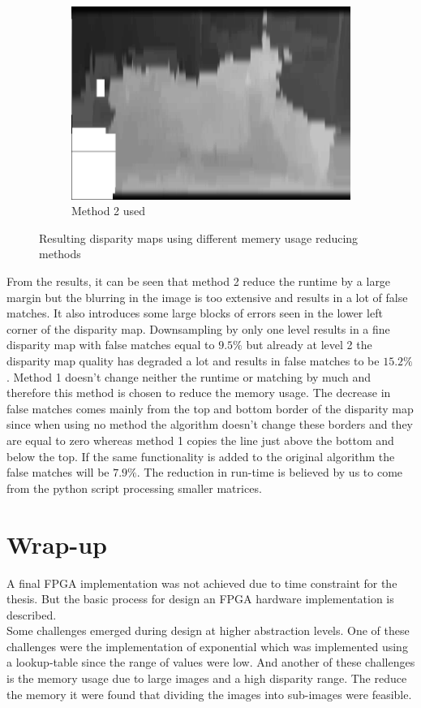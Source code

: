 \begin{figure}[!ht]
\begin{subfigure}[t]{0.3\textwidth}
    \centering\includegraphics[width=\textwidth]{figures/mot_eepsm_down}
    \caption{Method 2 used\label{fig:memmetdown}}
  \end{subfigure}
  \caption{Resulting disparity maps using different memery usage reducing methods\label{fig:memmetall}}
\end{figure}

From the results, it can be seen that method 2 reduce the runtime by a large margin but the blurring in the image is too extensive and results in a lot of false matches. It also introduces some large blocks of errors seen in the lower left corner of the disparity map. Downsampling by only one level results in a fine disparity map with false matches equal to $9.5\%$ but already at level 2 the disparity map quality has degraded a lot and results in false matches to be $15.2\%$. Method 1 doesn't change neither the runtime or matching by much and therefore this method is chosen to reduce the memory usage. The decrease in false matches comes mainly from the top and bottom border of the disparity map since when using no method the algorithm doesn't change these borders and they are equal to zero whereas method 1 copies the line just above the bottom and below the top. If the same functionality is added to the original algorithm the false matches will be $7.9\%$. The reduction in run-time is believed by us to come from the python script processing smaller matrices. 

\section{Wrap-up}
A final FPGA implementation was not achieved due to time constraint for the thesis. But the basic process for design an FPGA hardware implementation is described. \\
Some challenges emerged during design at higher abstraction levels. One of these challenges were the implementation of exponential which was implemented using a lookup-table since the range of values were low. And another of these challenges is the memory usage due to large images and a high disparity range. The reduce the memory it were found that dividing the images into sub-images were feasible. 